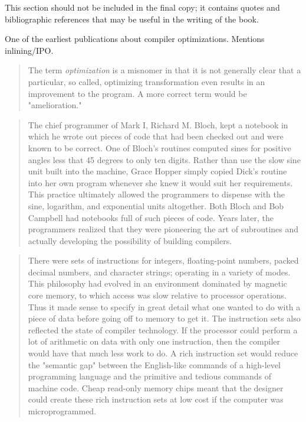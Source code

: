 
This section should not be included in the final copy;
it contains quotes and bibliographic references that may be useful in the writing of the book.

\vspace{1em}


One of the earliest publications about compiler optimizations. Mentions inlining/IPO.

\begin{quotation}
The term \textit{optimization} is a misnomer in that it is not generally clear that a particular, so called, optimizing transformation even results in an improvement to the program. A more correct term would be "amelioration."
\end{quotation}


\begin{quotation}
The chief programmer of Mark I, Richard M. Bloch, kept a notebook in which he wrote out pieces of code
that had been checked out and were known to be correct. One of Bloch's routines computed sines for
positive angles less that 45 degrees to only ten digits. Rather than use the slow sine unit built into the
machine, Grace Hopper simply copied Dick's routine into her own program whenever she knew it would suit
her requirements. This practice ultimately allowed the programmers to dispense with the sine, logarithm, and
exponential units altogether. Both Bloch and Bob Campbell had notebooks full of such pieces of code. Years
later, the programmers realized that they were pioneering the art of subroutines and actually developing the
possibility of building compilers.
\end{quotation}

\begin{quotation}
There were sets of instructions for integers, floating-point numbers, packed decimal numbers, and character
strings; operating in a variety of modes. This philosophy had evolved in an environment dominated by
magnetic core memory, to which access was slow relative to processor operations. Thus it made sense to
specify in great detail what one wanted to do with a piece of data before going off to memory to get it. The
instruction sets also reflected the state of compiler technology. If the processor could perform a lot of
arithmetic on data with only one instruction, then the compiler would have that much less work to do. A rich
instruction set would reduce the "semantic gap" between the English-like commands of a high-level
programming language and the primitive and tedious commands of machine code. Cheap read-only memory
chips meant that the designer could create these rich instruction sets at low cost if the computer was microprogrammed.
\end{quotation}

